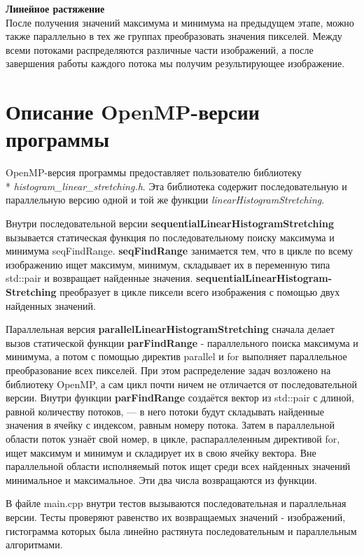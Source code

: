 \documentclass[14pt, russian]{extarticle}
\begin{document}
	\noindent\textbf{Линейное растяжение}\\
	\indent После получения значений максимума и минимума на предыдущем этапе, можно также параллельно в тех же группах преобразовать значения пикселей. Между всеми потоками распределяются различные части изображений, а после завершения работы каждого потока мы получим результирующее изображение.
	\newpage
	
	\section{Описание OpenMP-версии программы}
	
	OpenMP-версия программы предоставляет пользователю библиотеку\\* \emph{histogram\_linear\_stretching.h}. Эта библиотека содержит последовательную и параллельную версию одной и той же функции \emph{linearHistogramStretching}. 
 
    Внутри последовательной версии \textbf{sequentialLinearHistogramStretching} вызывается статическая функция по последовательному поиску максимума и минимума seqFindRange. \textbf{seqFindRange} занимается тем, что в цикле по всему изображению ищет максимум, минимум, складывает их в переменную типа std::pair и возвращает найденные значения. \textbf{sequentialLinearHistogram- Stretching} преобразует в цикле пиксели всего изображения с помощью двух найденных значений.

    Параллельная версия \textbf{parallelLinearHistogramStretching} сначала делает вызов статической функции \textbf{parFindRange} - параллельного поиска максимума и минимума, а потом с помощью директив parallel и for выполняет параллельное преобразование всех пикселей. При этом распределение задач возложено на библиотеку OpenMP, а сам цикл почти ничем не отличается от последовательной версии. Внутри функции \textbf{parFindRange} создаётся вектор из std::pair с длиной, равной количеству потоков, — в него потоки будут складывать найденные значения в ячейку с индексом, равным номеру потока. Затем в параллельной области поток узнаёт свой номер, в цикле, распараллеленным директивой for, ищет максимум и минимум и складирует их в свою ячейку вектора. Вне параллельной области исполняемый поток ищет среди всех найденных значений минимальное и максимальное. Эти два числа возвращаются из функции.
    
    В файле main.cpp внутри тестов вызываются последовательная и параллельная версии. Тесты проверяют равенство их возвращаемых значений - изображений, гистограмма которых была линейно растянута последовательным и параллельным алгоритмами.
	\newpage
	
\end{document}
